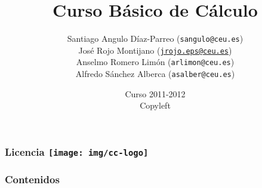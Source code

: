 \documentclass[mathserif,profesionalfont,10pt,dvips,blue,xcolor=table]{beamer}
\title{Curso Básico de Cálculo}
\author[]{
Santiago Angulo Díaz-Parreo (\texttt{sangulo@ceu.es})\\ 
José Rojo Montijano (\texttt{\url{jrojo.eps@ceu.es}})\\
Anselmo Romero Limón (\texttt{arlimon@ceu.es})\\
Alfredo Sánchez Alberca (\texttt{asalber@ceu.es})\\ 
}
\institute[USP CEU]{
\texttt{[image: img/logo\_uspceu\_01]}\\[0.5cm]Facultad de Farmacia
}
\date{Curso 2011-2012\\ \textcopyleft Copyleft}
\theoremstyle{definition}
\begin{document}
\begin{frame}
\titlepage
\end{frame}


\begin{frame}
\frametitle{Licencia \texttt{[image: img/cc-logo]}}

\end{frame}


\begin{frame}
\frametitle{Contenidos}
\setlength{\parskip}{0em}
\tableofcontents[hideallsubsections]
\end{frame}










\end{document}
